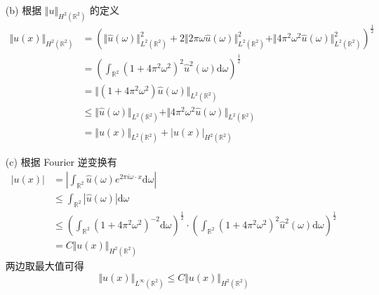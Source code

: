 \documentclass[a4paper]{article}
\begin{document}
\begin{enumerate}
\begin{equation}
                \end{equation}
    \item[(b)] 根据 $\Vert u \Vert_{H^2(\mathbb{R}^2)}$ 的定义
                \begin{equation}
                    \begin{aligned}
                        \Vert u(x) \Vert_{H^2(\mathbb{R}^2)}
                        &= \left(
                            \Vert \hat{u}(\omega) \Vert^2_{L^2(\mathbb{R}^2)}
                            + 2\Vert 2 \pi \omega\hat{u}(\omega) \Vert^2_{L^2(\mathbb{R}^2)}
                            + \Vert 4 \pi^2 \omega^2\hat{u}(\omega) \Vert^2_{L^2(\mathbb{R}^2)}
                        \right)^{\frac{1}{2}}\\
                        &= \left(
                            \int_{\mathbb{R}^2} 
                            (1+4\pi^2\omega^2)^2
                            \hat{u}^2(\omega) \text{d}\omega
                        \right)^{\frac{1}{2}}\\
                        &=\Vert (1+4\pi^2\omega^2)
                            \hat{u}(\omega) \Vert_{L^2(\mathbb{R}^2)}\\
                        &\leq
                        \Vert \hat{u}(\omega) \Vert_{L^2(\mathbb{R}^2)}
                        + \Vert 4 \pi^2 \omega^2\hat{u}(\omega) \Vert_{L^2(\mathbb{R}^2)}\\
                        &= \Vert u(x) \Vert_{L^2(\mathbb{R}^2)}
                            + |u(x)|_{H^2(\mathbb{R}^2)}
                    \end{aligned}
                \end{equation}
    \item[(c)]  根据 Fourier 逆变换有
                \begin{equation}
                    \begin{aligned}
                        |u(x)| &= \left|\int_{\mathbb{R}^2}
                            \hat{u}(\omega)e^{2\pi i \omega \cdot x} \text{d}\omega
                        \right|\\
                        &\leq \int_{\mathbb{R}^2} |\hat{u}(\omega)|\text{d}\omega\\
                        &\leq \left(
                            \int_{\mathbb{R}^2} (1+4\pi^2\omega^2)^{-2} \text{d}\omega
                        \right)^{\frac{1}{2}}
                        \cdot
                        \left(\int_{\mathbb{R}^2} 
                            (1+4\pi^2\omega^2)^2
                            \hat{u}^2(\omega) \text{d}\omega
                        \right)^{\frac{1}{2}}\\
                        &= C \Vert u(x) \Vert_{H^2(\mathbb{R}^2)}
                    \end{aligned}
                \end{equation}
                两边取最大值可得
                \begin{equation}
                    \Vert u(x) \Vert_{L^{\infty}(\mathbb{R}^2)}
                    \leq C \Vert u(x) \Vert_{H^ 2(\mathbb{R}^2)}
                \end{equation}
\end{enumerate}


\printbibliography
\end{document}
